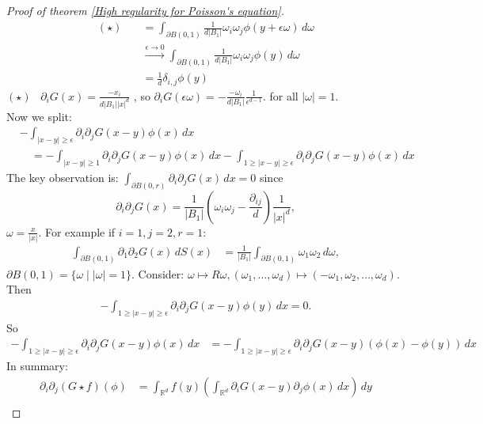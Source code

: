\documentclass{report}
\theoremstyle{tommy}
\begin{document}
\begin{proof}[Proof of theorem \ref{High regularity for Poisson's equation}]
\begin{align*}
      (\star) \quad &= \int_{\partial B(0, 1)} \frac{1}{d|B_1|} \omega_i \omega_j \phi(y + \epsilon \omega) \, d \omega \\
      &\xrightarrow{\epsilon \to 0} \int_{\partial B(0, 1)} \frac{1}{d|B_1|} \omega_i \omega_j \phi(y) \, d\omega \\
      &= \frac{1}{d} \delta_{i,j} \phi(y)
    \end{align*}
    \((\star)\) \ \(\partial_i G(x) = \frac{- x_i}{d|B_1||x|^d}\)
    , so \(\partial_i G(\epsilon \omega) = - \frac{- \omega_i}{d |B_1|} \frac{1}{\epsilon^{d-1}}.\) for all \(|\omega| = 1\). \\
    
    Now we split:
    \begin{align*}
      &- \int_{|x-y| \ge \epsilon} \partial_i \partial_j G(x-y) \phi(x) \, dx \\
      &\quad= - \int_{|x-y| \ge 1}  \partial_i \partial_j G(x-y) \phi(x) \, dx - \int_{1 \ge |x-y| \ge \epsilon}  \partial_i \partial_j G(x-y) \phi(x) \, dx
    \end{align*}
    The key observation is: \(\int_{\partial B(0, r)} \partial_i \partial_j G(x) \, dx = 0\) since \[\partial_i \partial_j G(x) = \frac{1}{|B_1|}\left(\omega_i \omega_j - \frac{\partial_{ij}}{d}\right) \frac{1}{|x|^d},\] \(\omega = \frac{x}{|x|}\). For example if \(i = 1, j = 2, r = 1\):
    \begin{align*}
      \int_{\partial B(0, 1)} \partial_1 \partial_2 G(x) \, dS(x) 
      &= \frac{1}{|B_1|} \int_{\partial B(0, 1)} \omega_1 \omega_2 \, d \omega,
    \end{align*}
    \(\partial B(0,1) = \{\omega \mid |\omega| = 1\}\). Consider: \(\omega \mapsto R \omega, (\omega_1, \dots, \omega_d) \mapsto (- \omega_1, \omega_2, \dots, \omega_d)\). Then
    \begin{align*}
      -\int_{1 \ge |x-y| \ge \epsilon} \partial_i \partial_j G(x-y) \phi(y) \, dx = 0.
    \end{align*}
    So 
    \begin{align*}
      - \int_{1 \ge |x-y| \ge \epsilon} \partial_i \partial_j G(x-y) \phi(x) \, dx &= - \int_{1 \ge |x-y|\ge \epsilon} \partial_i \partial_j G(x-y) (\phi(x) - \phi(y)) \, dx
    \end{align*}
    In summary:
    \begin{align*}
      \partial_i \partial_j (G \star f)(\phi)
      &= \int_{\mathbb{R}^d} f(y) \left(\int_{\mathbb{R}^d} \partial_i G(x-y) \partial_j \phi(x) \, dx\right) \, dy \\

\end{align*}
\end{proof}
\end{document}
